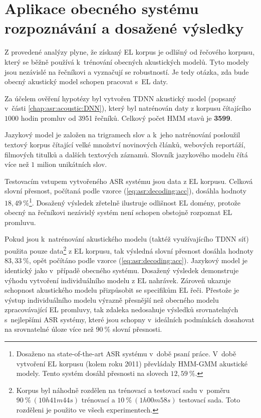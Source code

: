 \section{Aplikace obecného systému rozpoznávání a dosažené výsledky}
\label{chap:construction:results}

Z provedené analýzy plyne, že získaný EL korpus je odlišný od  řečového korpusu, který se běžně používá  k~trénování obecných akustických modelů.
Tyto modely jsou nezávislé na řečníkovi a vyznačují se robustností.
Je tedy otázka, zda bude obecný akustický model schopen pracovat s~EL daty.

Za účelem ověření hypotézy byl vytvořen TDNN akustický model (popsaný v~části \ref{chap:asr:acoustic:DNN}), který byl natrénován daty z korpusu čítajícího $1000$ hodin promluv od 3951 řečníků.
Celkový počet HMM stavů je \textbf{3599}.

Jazykový model je založen na trigramech slov a  k~jeho natrénování posloužil textový korpus čítající velké množství novinových článků, webových reportáží, filmových titulků a dalších textových záznamů.
Slovník jazykového modelu čítá více než $1$ milion unikátních slov.

Testovacím vstupem vytvořeného ASR systému jsou data z EL korpusu.
Celková slovní přesnost, počítaná podle vzorce (\ref{eq:asr:decoding:acc}), dosáhla hodnoty $18,49~\%$\footnote{Dosaženo na state-of-the-art ASR systému v~době psaní práce. V~době vytvoření EL korpusu (kolem roku 2011) převládaly HMM-GMM akustické modely. Tento systém dosáhl přesnosti na slovech $12,59~\%$.}.
Dosažený výsledek zřetelně ilustruje odlišnost EL domény, protože obecný na řečníkovi nezávislý systém není schopen obstojně rozpoznat EL promluvu.

Pokud jsou  k~natrénování akustického modelu (taktéž využívajícího TDNN síť) použita pouze data\footnote{Korpus byl náhodně rozdělen na trénovací a testovací sadu v~poměru $90~\%\ (10h41m44s)$ trénovací a $10~\%\ (1h00m58s)$ testovací sada. Toto rozděleni je použito ve všech experimentech.} z EL korpusu, tak výsledná slovní přesnost dosáhla hodnoty $83,33~\%$, opět počítáno podle vzorce (\ref{eq:asr:decoding:acc}).
Jazykový model je identický jako v~případě obecného systému.
Dosažený výsledek demonstruje výhodu vytvoření individuálního modelu z EL nahrávek.
Zároveň ukazuje schopnost akustického modelu přizpůsobit se specifikům EL řeči.
Přestože je výstup individuálního modelu výrazně přesnější než obecného modelu zpracovávající EL promluvy, tak zdaleka nedosahuje výsledků srovnatelných s~nejlepšími ASR systémy, které jsou schopny v~ideálních podmínkách dosahovat na srovnatelné úloze více než $90~\%$ slovní přesnosti.


